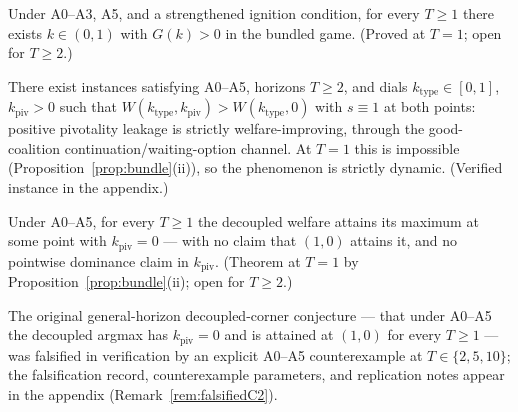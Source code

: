 \begin{conjecture}\label{conj:interiorT}
Under A0--A3, A5, and a strengthened ignition condition, for every $T\ge 1$ there exists
$k\in(0,1)$ with $G(k)>0$ in the bundled game. (Proved at $T=1$; open for $T\ge 2$.)
\end{conjecture}

\begin{observation}\label{obs:leakagehelps}
There exist instances satisfying A0--A5, horizons $T\ge 2$, and dials
$k_{\mathrm{type}}\in[0,1]$, $k_{\mathrm{piv}}>0$ such that
$W(k_{\mathrm{type}},k_{\mathrm{piv}})>W(k_{\mathrm{type}},0)$ with $s\equiv 1$ at both
points: positive pivotality leakage is strictly welfare-improving, through the good-coalition
continuation/waiting-option channel. At $T=1$ this is impossible
(Proposition~\ref{prop:bundle}(ii)), so the phenomenon is strictly dynamic. (Verified
instance in the appendix.)
\end{observation}

\begin{conjecture}[narrowed residual conjecture: decoupled argmax retains $k_{\mathrm{piv}}=0$]\label{conj:decoupledT}
Under A0--A5, for every $T\ge 1$ the decoupled welfare attains its maximum at some point with
$k_{\mathrm{piv}}=0$ --- with no claim that $(1,0)$ attains it, and no pointwise dominance
claim in $k_{\mathrm{piv}}$. (Theorem at $T=1$ by Proposition~\ref{prop:bundle}(ii); open for
$T\ge 2$.)
\end{conjecture}

The original general-horizon decoupled-corner conjecture --- that under A0--A5 the decoupled
argmax has $k_{\mathrm{piv}}=0$ and is attained at $(1,0)$ for every $T\ge 1$ --- was falsified
in verification by an explicit A0--A5 counterexample at $T\in\{2,5,10\}$; the falsification
record, counterexample parameters, and replication notes appear in the appendix
(Remark~\ref{rem:falsifiedC2}).
